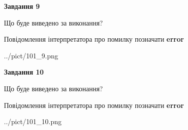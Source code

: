 \documentclass[12pt, ukrainian]{article}
\begin{document}
{{\begin {center}\textbf{Завдання 9}\end {center}}\par
Що буде виведено за виконання? \par
Повідомлення інтерпретатора про помилку позначати \textbf{error}

\begin{center}
	{../pict/101_9.png}
\end{center}
\newpage

{\begin {center}\textbf{Завдання 10}\end {center}}\par
Що буде виведено за виконання? \par
Повідомлення інтерпретатора про помилку позначати \textbf{error}

\begin{center}
	{../pict/101_10.png}
\end{center}
\newpage

}
\end{document}
